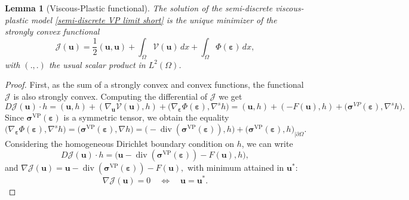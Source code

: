\documentclass[11pt]{article}
\newtheorem{lemma}[theorem]{Lemma}
\newcommand{\bu}{\mathbf{u}}
\newcommand{\sig}{\boldsymbol{\sigma}}
\newcommand{\beps}{\boldsymbol{\varepsilon}}
\begin{document}
\begin{lemma}[Viscous-Plastic functional]
\label{lemma: VP functional}
    The solution of the semi-discrete viscous-plastic model \eqref{semi-discrete VP limit short} is the unique minimizer of the strongly convex functional 
    \begin{equation}
        \mathcal{J}(\bu) = \frac12 (\bu,\bu)+\int_\Omega \mathcal{V}(\bu) \,dx + \int_\Omega \Phi(\beps)\,dx,
    \end{equation}with $(.,.)$ the usual scalar product in $L^2(\Omega)$.
\end{lemma}
\begin{proof}
    First, as the sum of a strongly convex and convex functions, the functional $\mathcal{J}$ is also strongly convex. Computing the differential of $\mathcal{J}$ we get 
    $$D\mathcal J(\bu)\cdot h =(\bu,h)+(\nabla_{\bu}\mathcal{V}(\bu),h)+
\bigl(\nabla_{\beps}\Phi(\beps),\nabla^s h\bigr) = (\bu,h)+(-F(\bu),h)+
\bigl(\sig^{VP}(\beps),\nabla^s h\bigr).
    $$Since $\sig^{\mathrm{VP}}(\beps)$ is a symmetric tensor, we obtain the equality
$$
\bigl(\nabla_{\beps}\Phi(\beps),\nabla^s h\bigr)
=
\bigl(\sig^{\mathrm{VP}}(\beps),\nabla h\bigr)
=
\bigl(-\operatorname{div}(\sig^{\mathrm{VP}}(\beps)),h\bigr) + \bigl(\sig^{\mathrm{VP}}(\beps), h\bigr)_{|\partial \Omega}.
$$Considering the homogeneous Dirichlet boundary condition on $h$, we can write
$$D\mathcal J(\bu)\cdot h = \bigl(\bu-\operatorname{div}(\sig^{\mathrm{VP}}(\beps))-F(\bu),h\bigr),
$$and $\nabla \mathcal J(\bu)=\bu-\operatorname{div}(\sig^{\mathrm{VP}}(\beps))-F(\bu),$ with minimum attained in $\bu^*$:$$
\nabla \mathcal J(\bu)=0
\quad\Longleftrightarrow\quad
\bu=\bu^*.$$\end{proof}

\end{document}
